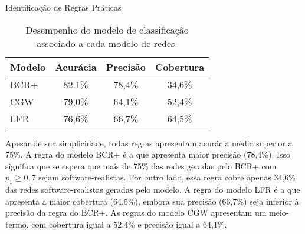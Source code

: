 \begin{section}{Identificação de Regras Práticas}
	\begin{table}
	\caption{Desempenho do modelo de classificação associado a cada modelo de redes.}
	\centering
	\begin{tabular}{|l|c|c|c|}
	\hline
	\textbf{Modelo} & \textbf{Acurácia} & \textbf{Precisão} & \textbf{Cobertura} \\
	\hline 
	\hline
	BCR+ &  82.1\%  &  78,4\%  &  34,6\% \\
	\hline
	CGW  &  79,0\%  &  64,1\%  &  52,4\% \\
	\hline
	LFR  &  76,6\%  &  66,7\%  &  64,5\% \\
	\hline
	\end{tabular}
	\label{tab:rules}
	\end{table}

	Apesar de sua simplicidade, todas regras apresentam acurácia média superior a 75\%. A regra do modelo BCR+ é a que apresenta maior precisão (78,4\%). Isso significa que se espera que mais de 75\% das redes geradas pelo BCR+ com $p_1 \ge 0,7$ sejam software-realistas. Por outro lado, essa regra cobre apenas 34,6\% das redes software-realistas geradas pelo modelo. A regra do modelo LFR é a que apresenta a maior cobertura (64,5\%), embora sua precisão (66,7\%) seja inferior à precisão da regra do BCR+. As regras do modelo CGW apresentam um meio-termo, com cobertura igual a 52,4\% e precisão igual a 64,1\%.
	




\end{section}
